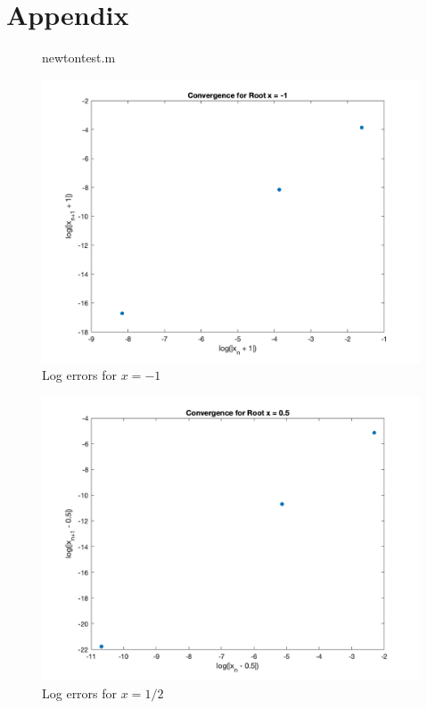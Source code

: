 \documentclass[11pt]{article}
\begin{document}
\section*{Appendix}

% 

% 

\begin{figure}[h!]
  \centering
  
  \caption{newtontest.m}
  \label{fig:newtontest.m}
  \end{figure}

\begin{figure}[h!]
  \centering
  \includegraphics[width=0.8\linewidth]{newton_root_1.png}
  \caption{Log errors for $x = -1$}
  \label{fig:newton_root_1}
\end{figure}

\begin{figure}[h!]
  \centering
  \includegraphics[width=0.8\linewidth]{newton_root_2.png}
  \caption{Log errors for $x = 1/2$}
  \label{fig:newton_root_2}
\end{figure}
\end{document}
